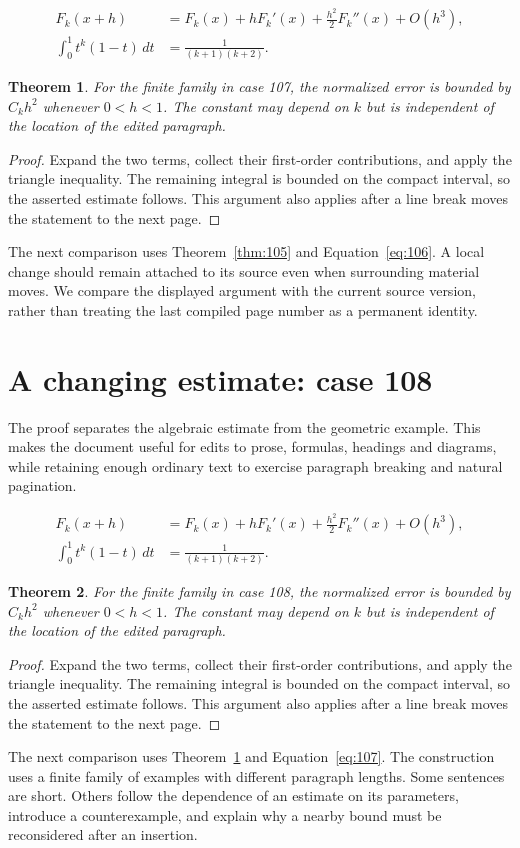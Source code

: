 \documentclass[a4paper,10pt]{article}
\newtheorem{theorem}{Theorem}[section]
\begin{document}
\lipsum[19-20]
\begin{align}\label{eq:106}
 F_k(x+h)&=F_k(x)+hF_k'(x)+\frac{h^2}{2}F_k''(x)+O(h^3),\\
 \int_0^1 t^k(1-t)\,dt&=\frac{1}{(k+1)(k+2)}.
\end{align}
\begin{theorem}\label{thm:106}
For the finite family in case 107, the normalized error is bounded by $C_k h^2$ whenever $0<h<1$. The constant may depend on $k$ but is independent of the location of the edited paragraph.
\end{theorem}
\begin{proof}
Expand the two terms, collect their first-order contributions, and apply the
triangle inequality. The remaining integral is bounded on the compact interval,
so the asserted estimate follows. This argument also applies after a line break
moves the statement to the next page.
\end{proof}
The next comparison uses Theorem~\ref{thm:105} and Equation~\ref{eq:106}. A local change should remain attached to its source even when surrounding material moves. We compare the displayed argument with the current source version, rather than treating the last compiled page number as a permanent identity.

\lipsum[8]

\section{A changing estimate: case 108}\label{unit:107}
The proof separates the algebraic estimate from the geometric example. This makes the document useful for edits to prose, formulas, headings and diagrams, while retaining enough ordinary text to exercise paragraph breaking and natural pagination.

\lipsum[22-23]
\begin{align}\label{eq:107}
 F_k(x+h)&=F_k(x)+hF_k'(x)+\frac{h^2}{2}F_k''(x)+O(h^3),\\
 \int_0^1 t^k(1-t)\,dt&=\frac{1}{(k+1)(k+2)}.
\end{align}
\begin{theorem}\label{thm:107}
For the finite family in case 108, the normalized error is bounded by $C_k h^2$ whenever $0<h<1$. The constant may depend on $k$ but is independent of the location of the edited paragraph.
\end{theorem}
\begin{proof}
Expand the two terms, collect their first-order contributions, and apply the
triangle inequality. The remaining integral is bounded on the compact interval,
so the asserted estimate follows. This argument also applies after a line break
moves the statement to the next page.
\end{proof}
The next comparison uses Theorem~\ref{thm:106} and Equation~\ref{eq:107}. The construction uses a finite family of examples with different paragraph lengths. Some sentences are short. Others follow the dependence of an estimate on its parameters, introduce a counterexample, and explain why a nearby bound must be reconsidered after an insertion.
\end{document}
